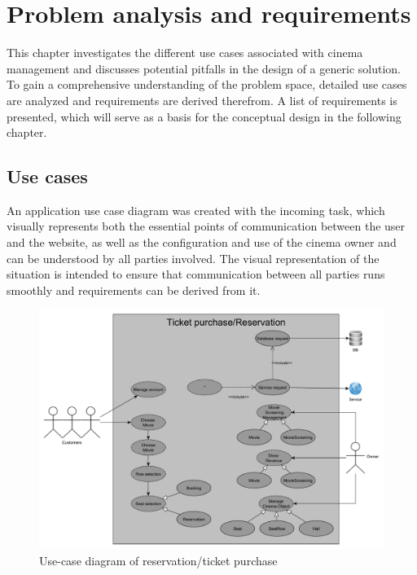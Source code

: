 \chapter{Problem analysis and requirements}
\label{ch:problem-analysis}

This chapter investigates the different use cases associated with cinema management and discusses potential pitfalls in the design of a generic solution. To gain a comprehensive understanding of the problem space, detailed use cases are analyzed and requirements are derived therefrom. A list of requirements is presented, which will serve as a basis for the conceptual design in the following chapter.

\section{Use cases}\label{sec:use-cases}


An application use case diagram was created with the incoming task, which visually represents both the essential points of communication between the user and the website, as well as the configuration and use of the cinema owner and can be understood by all parties involved. The visual representation of the situation is intended to ensure that communication between all parties runs smoothly and requirements can be derived from it.

\begin{figure}[H]
    \centering
    \includegraphics[width=\textwidth]{images/iis-use.case.pdf}
    \caption{Use-case diagram of reservation/ticket purchase}
    \label{fig:use-cases}
\end{figure}

